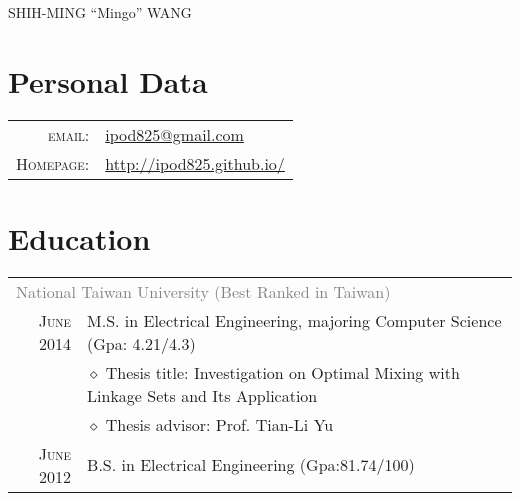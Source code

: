 \documentclass[a4paper,10pt]{article}
\begin{document}
\pagestyle{empty} %

\par{\centering
		{\Huge SHIH-MING ``Mingo'' WANG
	}\bigskip\par}

\section{Personal Data}

\begin{tabular}{rl}
    \textsc{email:}     & \href{mailto:ipod825@gmail.com}{ipod825@gmail.com}\\
\textsc{Homepage:} & \href{http://ipod825.github.io/}{http://ipod825.github.io/}
    
\end{tabular}

\section{Education}
\begin{tabular}{r|l}	
\multicolumn{2}{l}{\textcolor{gray}{National Taiwan University (Best Ranked in Taiwan)}}\\
\textsc{June 2014}          & M.S. in Electrical Engineering, majoring Computer Science (Gpa: 4.21/4.3)\\
                            & $\diamond$ Thesis title: Investigation on Optimal Mixing with Linkage Sets and Its Application\\
                            & $\diamond$ Thesis advisor: Prof. Tian-Li Yu\\
\textsc{June 2012}          & B.S. in Electrical Engineering (Gpa:81.74/100)\\       
\end{tabular}
\end{document}
